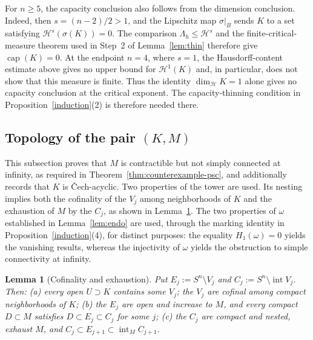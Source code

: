 \documentclass[12pt,oneside,a4paper]{article}
\theoremstyle{mytheorem}
\newtheorem{lemma}[definition]{Lemma}
\theoremstyle{remark}
\theoremstyle{definition}
\begin{document}
For $n\geq5$, the capacity conclusion also follows from the dimension
conclusion.  Indeed, then $s=(n-2)/2>1$, and the Lipschitz map
$\sigma|_B$ sends $K$ to a set satisfying
$\mathcal{H}^s(\sigma(K))=0$.  The comparison
$\Lambda_h\leq\mathcal{H}^s$ and the finite-critical-measure theorem used
in Step~2 of Lemma~\ref{lem:thin} therefore give
$\operatorname{cap}(K)=0$.  At the endpoint $n=4$, where $s=1$, the
Hausdorff-content estimate above gives no upper bound for
$\mathcal{H}^1(K)$ and, in particular, does not show that this measure is
finite.  Thus the identity $\dim_{\mathcal{H}}K=1$ alone gives no
capacity conclusion at the critical exponent.  The capacity-thinning
condition in Proposition~\ref{induction}(2) is therefore needed there.








\subsection{Topology of the pair \texorpdfstring{$(K,M)$}{(K,M)}}
This subsection proves that $M$ is contractible but not simply connected
at infinity, as required in Theorem~\ref{thm:counterexample-psc}, and
additionally records that $K$ is \v{C}ech-acyclic.  Two properties of the tower are
used.  Its nesting implies both the cofinality of the $V_j$ among
neighborhoods of $K$ and the exhaustion of $M$ by the $C_j$, as shown in
Lemma~\ref{cofinal}.  The two properties of $\omega$ established in
Lemma~\ref{lem:endo} are used, through the marking identity in
Proposition~\ref{induction}(4), for distinct purposes: the equality
$H_1(\omega)=0$ yields the vanishing results, whereas the injectivity of
$\omega$ yields the obstruction to simple connectivity at infinity.

\begin{lemma}[Cofinality and exhaustion]\label{cofinal}
Put $E_j:=S^n\setminus V_j$ and
$C_j:=S^n\setminus\operatorname{int}V_j$.  Then:
\textup{(a)} every open $U\supset K$ contains some $V_j$; the $V_j$
are cofinal among compact neighborhoods of $K$;
\textup{(b)} the $E_j$ are open and increase to $M$, and every compact
$D\subset M$ satisfies $D\subset E_j\subset C_j$ for some $j$;
\textup{(c)} the $C_j$ are compact and nested, exhaust $M$, and
$C_j\subset E_{j+1}\subset\operatorname{int}_M C_{j+1}$.
\end{lemma}
\end{document}
